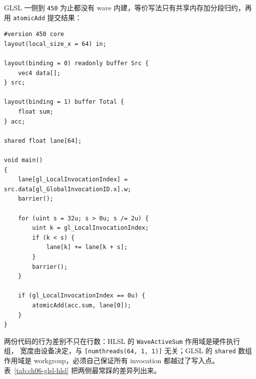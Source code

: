 \documentclass[12pt,a4paper,fontset=fandol]{ctexbook}
\newcommand{\Tp}[1]{\texttt{#1}}
\newcommand{\Lang}[1]{\textsf{#1}}
\newcommand{\GSL}{\Lang{GLSL}}
\newcommand{\HSL}{\Lang{HLSL}}
\begin{document}
\GSL{} 一侧到 \Tp{450} 为止都没有 wave 内建，等价写法只有共享内存加分段归约，再
用 \Tp{atomicAdd} 提交结果：

\begin{lstlisting}[style=glslstyle,caption={同一个归约的 \GSL{} 写法：shared 分段相加后原子提交},label={lst:ch06-cs-glsl}]
#version 450 core
layout(local_size_x = 64) in;

layout(binding = 0) readonly buffer Src {
    vec4 data[];
} src;

layout(binding = 1) buffer Total {
    float sum;
} acc;

shared float lane[64];

void main()
{
    lane[gl_LocalInvocationIndex] = src.data[gl_GlobalInvocationID.x].w;
    barrier();

    for (uint s = 32u; s > 0u; s /= 2u) {
        uint k = gl_LocalInvocationIndex;
        if (k < s) {
            lane[k] += lane[k + s];
        }
        barrier();
    }

    if (gl_LocalInvocationIndex == 0u) {
        atomicAdd(acc.sum, lane[0]);
    }
}
\end{lstlisting}

两份代码的行为差别不只在行数：\HSL{} 的 \Tp{WaveActiveSum} 作用域是硬件执行组，
宽度由设备决定，与 \Tp{[numthreads(64, 1, 1)]} 无关；\GSL{} 的 \Tp{shared} 数组
作用域是 workgroup，必须自己保证所有 invocation 都越过了写入点。
表~\ref{tab:ch06-glsl-hlsl} 把两侧最常踩的差异列出来。
\end{document}
